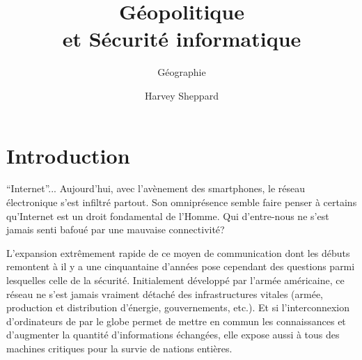 \documentclass[article, french]{yReport}
\author{Harvey Sheppard}
\subtitle{Géographie}
\title{Géopolitique\\et Sécurité informatique}
\begin{document}
	
	\startcontents
	\printMarginPartialToc[1][En Bref]
	
	\section{Introduction}
	\enquote{Internet}...
	Aujourd'hui, avec l'avènement des smartphones, le réseau électronique s'est infiltré partout.
	Son omniprésence semble faire penser à certains qu'Internet est un droit fondamental de l'Homme.
	Qui d'entre-nous ne s'est jamais senti bafoué par une mauvaise connectivité?
	
	L'expansion extrêmement rapide de ce moyen de communication dont les débuts remontent à il y a une cinquantaine d'années%
	pose cependant des questions parmi lesquelles celle de la sécurité.
	Initialement développé par l'armée américaine, ce réseau ne s'est jamais vraiment détaché des infrastructures vitales (armée, production et distribution d'énergie, gouvernements, etc.).
	Et si l'interconnexion d'ordinateurs de par le globe permet de mettre en commun les connaissances et d'augmenter la quantité d'informations échangées, elle expose aussi à tous des machines critiques pour la survie de nations entières.
	
\end{document}
